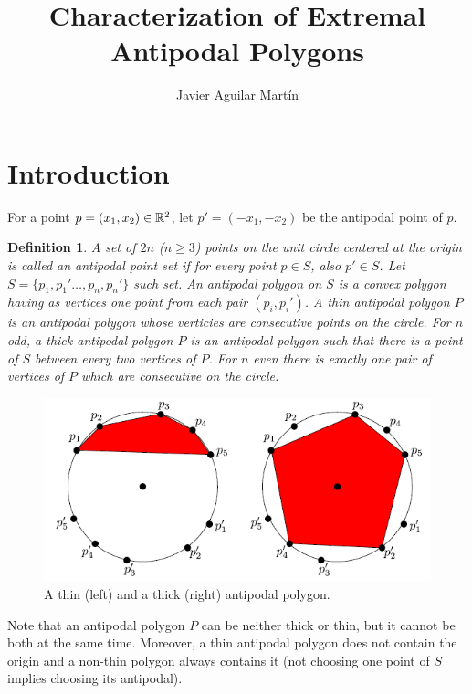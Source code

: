 \documentclass[twoside]{article}
\newtheorem{defin}{Definition}[section]
\begin{document}
\title{Characterization of Extremal Antipodal Polygons}
\author{Javier Aguilar Martín}
\maketitle

\section{Introduction}

For a point $p=(x_1,x_2)\in\mathbb{R}^2$, let $p'=(-x_1,-x_2)$ be the antipodal point of $p$.

\begin{defin}
A set of $2n$ ($n\geq 3$) points on the unit circle centered at the origin is called an \emph{antipodal point set} if for every point $p\in S$, also $p'\in S$. Let $S=\{p_1,p_1'\dots,p_n,p_n'\}$ such set. An \emph{antipodal polygon} on $S$ is a convex polygon  having as vertices one point from each pair $(p_i,p_i')$. A \emph{thin} antipodal polygon $P$ is an antipodal polygon whose verticies are consecutive points on the circle. For $n$ odd, a \emph{thick} antipodal polygon $P$ is an antipodal polygon such that there is a point of $S$ between every two vertices of $P$. For $n$ even there is exactly one pair of vertices of $P$ which are consecutive on the circle. 
\end{defin}

\begin{figure}[h!]
\centering
\includegraphics[scale=0.7]{fig1}
\caption{A thin (left) and a thick (right) antipodal polygon.}
\end{figure}
 
 
 Note that an antipodal polygon $P$ can be neither thick or thin, but it cannot be both at the same time. Moreover, a thin antipodal polygon does not contain the origin and a non-thin polygon always contains it (not choosing one point of $S$ implies choosing its antipodal). 
 
\end{document}
